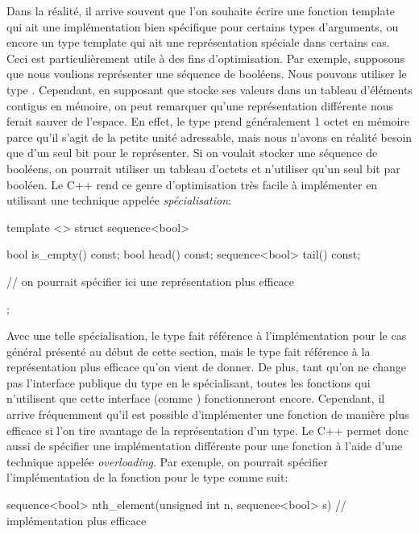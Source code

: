 Dans la réalité, il arrive souvent que l'on souhaite écrire une fonction
template qui ait une implémentation bien spécifique pour certains types
d'arguments, ou encore un type template qui ait une représentation spéciale
dans certains cas. Ceci est particulièrement utile à des fins d'optimisation.
Par exemple, supposons que nous voulions représenter une séquence de booléens.
Nous pouvons utiliser le type . Cependant, en supposant
que  stocke ses valeurs dans un tableau d'éléments contigus en
mémoire, on peut remarquer qu'une représentation différente nous ferait sauver
de l'espace. En effet, le type  prend généralement 1 octet en mémoire
parce qu'il s'agit de la petite unité adressable, mais nous n'avons en réalité
besoin que d'un seul bit pour le représenter. Si on voulait stocker une
séquence de booléens, on pourrait utiliser un tableau d'octets et n'utiliser
qu'un seul bit par booléen. Le C++ rend ce genre d'optimisation très facile
à implémenter en utilisant une technique appelée \textit{spécialisation}:
\begin{cpp}
    template <>
    struct sequence<bool> {
        bool is_empty() const;
        bool head() const;
        sequence<bool> tail() const;

        // on pourrait spécifier ici une représentation plus efficace
    };
\end{cpp}

Avec une telle spécialisation, le type  fait référence à
l'implémentation pour le cas général présenté au début de cette section,
mais le type  fait référence à la représentation plus
efficace qu'on vient de donner. De plus, tant qu'on ne change pas l'interface
publique du type  en le spécialisant, toutes les fonctions
qui n'utilisent que cette interface (comme ) fonctionneront
encore. Cependant, il arrive fréquemment qu'il est possible d'implémenter une
fonction de manière plus efficace si l'on tire avantage de la représentation
d'un type. Le C++ permet donc aussi de spécifier une implémentation différente
pour une fonction à l'aide d'une technique appelée \textit{overloading}. Par
exemple, on pourrait spécifier l'implémentation de la fonction
 pour le type  comme suit:
\begin{cpp}
    sequence<bool> nth_element(unsigned int n, sequence<bool> s) {
        // implémentation plus efficace
    }
\end{cpp}

